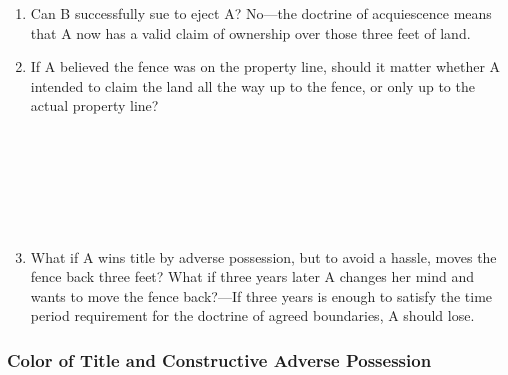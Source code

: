 \begin{enumerate}
\begin{enumerate}
        \item Can B successfully sue to eject A? No---the doctrine of 
        acquiescence means that A now has a valid claim of ownership over 
        those three feet of land.
        \item If A believed the fence was on the property line, should it 
        matter whether A intended to claim the land all the way up to the 
        fence, or only up to the actual property line?
        ~\\\\\\\\\\\\\\
        \item What if A wins title by adverse possession, but to avoid a 
        hassle, moves the fence back three feet? What if three years later A 
        changes her mind and wants to move the fence back?---If three years is 
        enough to satisfy the time period requirement for the doctrine of 
        agreed boundaries, A should lose.
    \end{enumerate}
\end{enumerate}

\subsubsection{Color of Title and Constructive Adverse Possession}

